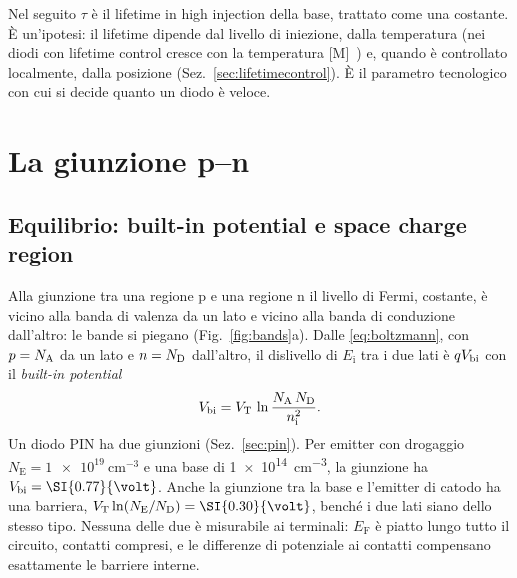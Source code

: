 \documentclass[10pt,a4paper]{scrartcl}
\let\newcommand\pdvaluedefine
\newcommand{\VT}{V_\mathrm{T}}
\newcommand{\ND}{N_\mathrm{D}}
\newcommand{\NA}{N_\mathrm{A}}
\newcommand{\nint}{n_\mathrm{i}}
\newcommand{\Vbi}{V_\mathrm{bi}}
\newcommand{\Pp}{p\textsuperscript{+}}
\newcommand{\Nm}{n\textsuperscript{--}}
\newcommand{\Np}{n\textsuperscript{+}}
\begin{document}
Nel seguito $\tau$ è il lifetime in high injection della base, trattato come una costante. È un'ipotesi: il lifetime dipende dal livello di iniezione, dalla temperatura (nei diodi con lifetime control cresce con la temperatura [M]~\cite{lutz}) e, quando è controllato localmente, dalla posizione (Sez.~\ref{sec:lifetimecontrol}). È il parametro tecnologico con cui si decide quanto un diodo è veloce.

\section{La giunzione p--n}
\label{sec:junction}
\subsection{Equilibrio: built-in potential e space charge region}
\label{sec:equilibrium}
Alla giunzione tra una regione p e una regione n il livello di Fermi, costante, è vicino alla banda di valenza da un lato e vicino alla banda di conduzione dall'altro: le bande si piegano (Fig.~\ref{fig:bands}a). Dalle \eqref{eq:boltzmann}, con $p = \NA$ da un lato e $n = \ND$ dall'altro, il dislivello di $E_\mathrm{i}$ tra i due lati è $q\Vbi$ con il \emph{built-in potential}
\begin{equation}
\Vbi = \VT\,\ln\frac{\NA\,\ND}{\nint^2} .
\label{eq:vbi}
\end{equation}
Un diodo PIN ha due giunzioni (Sez.~\ref{sec:pin}). Per emitter con drogaggio $N_\mathrm{E} = \SI{1e19}{\centi\metre^{-3}}$ e una base \Nm{} di \SI{1e14}{\centi\metre^{-3}}, la giunzione \Pp\Nm{} ha $\Vbi = \SI{\pdVbi}{\volt}$. Anche la giunzione \Nm\Np{} tra la base e l'emitter di catodo ha una barriera, $\VT\ln(N_\mathrm{E}/\ND) = \SI{\pdVbiTwo}{\volt}$, benché i due lati siano dello stesso tipo. Nessuna delle due è misurabile ai terminali: $E_\mathrm{F}$ è piatto lungo tutto il circuito, contatti compresi, e le differenze di potenziale ai contatti compensano esattamente le barriere interne.
\end{document}
